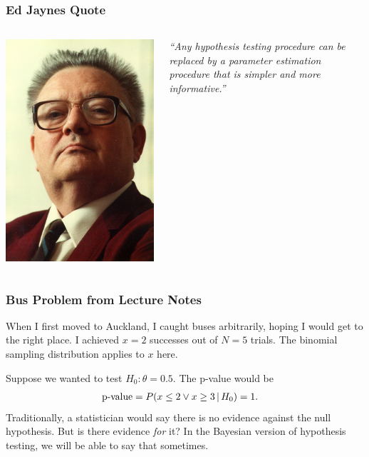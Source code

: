 \documentclass{beamer}
\newcommand{\given}{\,|\,}
\begin{document}
\begin{frame}
\frametitle{Ed Jaynes Quote}

    \begin{columns} %
        \includegraphics[width=0.7\linewidth]{images/jaynes.jpg}

        {\em ``Any hypothesis testing
procedure can be
replaced by a parameter
estimation procedure that
is simpler and more
informative.''}
     \end{columns}

\end{frame}


\begin{frame}
\frametitle{Bus Problem from Lecture Notes}
When I first moved to Auckland, I caught buses arbitrarily, hoping I would
get to the right place. I achieved $x=2$ successes out of $N=5$ trials.
The binomial sampling distribution applies to $x$ here.\pause

Suppose we wanted to test $H_0: \theta = 0.5$. The p-value would be
\begin{align}
\textnormal{p-value} &= P(x \leq 2 \vee x \geq 3 \given H_0) = 1.
\end{align}
\pause
Traditionally, a statistician would say there is no evidence against the null
hypothesis. But is there evidence {\em for} it? In the Bayesian version of
hypothesis testing, we will be able to say that sometimes.

\end{frame}
\end{document}
